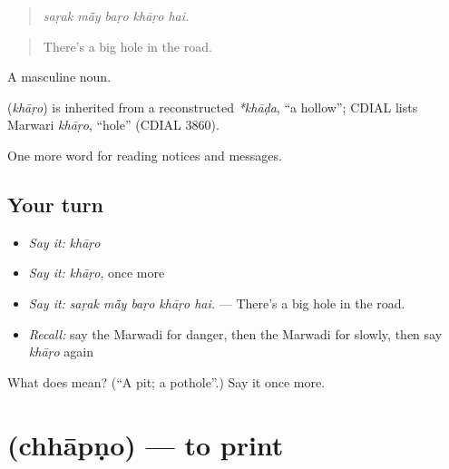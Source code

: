 \begin{quote}
    
\end{quote}

\begin{quote}
\emph{saṛak mā̃y baṛo khāṛo hai.}
\end{quote}

\begin{quote}
There's a big hole in the road.
\end{quote}

A masculine noun.

\begin{cousinweb}
\textbf{} (\emph{khāṛo}) is inherited from a reconstructed \emph{*khāḍa}, \textquotedblleft{}a hollow\textquotedblright{}; CDIAL lists Marwari \emph{khāṛo}, \textquotedblleft{}hole\textquotedblright{} (CDIAL 3860).
\end{cousinweb}

\begin{grammarlens}[title={What you've built}]
One more word for reading notices and messages.
\end{grammarlens}

\subsection*{Your turn}
\begin{itemize}
\raggedright
  \item \emph{Say it:} \emph{khāṛo}
  \item \emph{Say it:} \emph{khāṛo}, once more
  \item \emph{Say it:} \emph{saṛak mā̃y baṛo khāṛo hai.} — There's a big hole in the road.
  \item \emph{Recall:} say the Marwadi for danger, then the Marwadi for slowly, then say \emph{khāṛo} again
\end{itemize}

\begin{tcolorbox}[breakable,colback=teal!4,colframe=teal!35!black,title={Before you move on}]
What does  mean? (\textquotedblleft{}A pit; a pothole\textquotedblright{}.) Say it once more.
\end{tcolorbox}
\section[\texorpdfstring{\mw{छापणो} (chhāpṇo)}{छापणो (chhāpṇo)}]{ (chhāpṇo) — to print}

